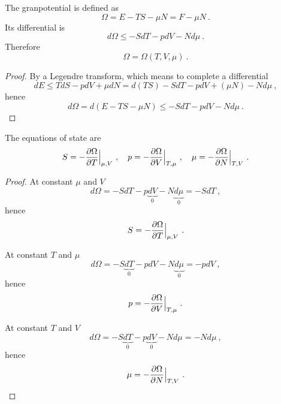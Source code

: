     The granpotential is defined as 
    \begin{equation}\label{ome}
        \Omega = E - TS - \mu N = F - \mu N ~.
    \end{equation}
    Its differential is 
    \begin{equation*}
        d\Omega \leq - SdT - pdV - N d\mu ~.
    \end{equation*}
    Therefore
    \begin{equation*}
        \Omega = \Omega(T, V, \mu) ~.
    \end{equation*}
    \begin{proof}
        By a Legendre transform, which means to complete a differential
        \begin{equation*}
            dE \leq T dS - p dV + \mu dN = d(TS) - SdT - p dV + (\mu N) - N d\mu ~,
        \end{equation*}
        hence 
        \begin{equation*}
            d\Omega = d(E - TS - \mu N) \leq - SdT - p dV - N d\mu ~.
        \end{equation*}
    \end{proof}

    The equations of state are
    \begin{equation}
        S = - \frac{\partial\Omega}{\partial T} \Big \vert_{\mu,V} ~, \quad p = - \frac{\partial\Omega}{\partial V} \Big \vert_{T,\mu} ~, \quad \mu = - \frac{\partial\Omega}{\partial N} \Big \vert_{T,V} ~. 
    \end{equation}
    \begin{proof}
        At constant $\mu$ and $V$
        \begin{equation*}
            d\Omega = - SdT - p\underbrace{dV}_0 - N \underbrace{d\mu}_0 = - S dT ~,
        \end{equation*}
        hence 
        \begin{equation*}
            S = - \frac{\partial\Omega}{\partial T} \Big \vert_{\mu,V} ~.
        \end{equation*}

        At constant $T$ and $\mu$
        \begin{equation*}
            d\Omega = - S \underbrace{dT}_0 - pdV - N \underbrace{d\mu}_ 0 = - p dV ~,
        \end{equation*}
        hence 
        \begin{equation*}
            p = - \frac{\partial\Omega}{\partial V} \Big \vert_{T,\mu} ~.
        \end{equation*}

        At constant $T$ and $V$
        \begin{equation*}
            d\Omega = - S\underbrace{dT}_0 - p\underbrace{dV}_0 - N d\mu = - N d\mu~,
        \end{equation*}
        hence 
        \begin{equation*}
            \mu = - \frac{\partial\Omega}{\partial N} \Big \vert_{T,V} ~.
        \end{equation*}
    \end{proof}

